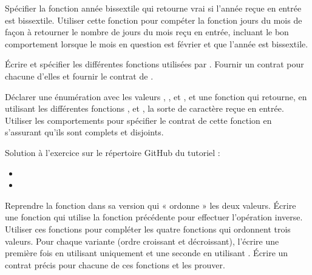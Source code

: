 \label{l4:contract-modularity-ex-days-of-month}


Spécifier la fonction année bissextile qui retourne vrai si l'année reçue
en entrée est bissextile. Utiliser cette fonction pour compéter la fonction
jours du mois de façon à retourner le nombre de jours du mois reçu en entrée,
incluant le bon comportement lorsque le mois en question est février et que
l'année est bissextile.






\label{l4:contract-modularity-ex-alpha-num}


Écrire et spécifier les différentes fonctions utilisées par
. Fournir un contrat pour chacune d'elles et
fournir le contrat de .





Déclarer une énumération avec les valeurs , ,
 et , et une fonction 
qui retourne, en utilisant les différentes fonctions ,
 et , la sorte de caractère reçue
en entrée. Utiliser les comportements pour spécifier le contrat de cette fonction
en s'assurant qu'ils sont complets et disjoints.


\begin{Information}
  Solution à l'exercice sur le répertoire GitHub du tutoriel :
  \begin{itemize}
    \item {}
    \item {}
  \end{itemize}
\end{Information}




Reprendre la fonction  dans sa version qui « ordonne »
les deux valeurs. Écrire une fonction  qui utilise la
fonction précédente pour effectuer l'opération inverse. Utiliser ces fonctions
pour compléter les quatre fonctions qui ordonnent trois valeurs. Pour chaque
variante (ordre croissant et décroissant), l'écrire une première fois en
utilisant uniquement  et une seconde en utilisant
. Écrire un contrat précis pour chacune de ces fonctions
et les prouver.


